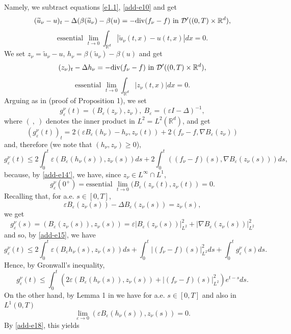 \documentclass[12pt]{article}
\def\cald{{\mathcal{D}}}
\def\dd{\displaystyle}
\theoremstyle{definition}
\def\rr{{\mathbb{R}}}
\def\9{{\infty}}
\def\wt{\widetilde}
\def\vp{{\varepsilon}}
\def\dd{\displaystyle}
\begin{document}
 Namely, we subtract equations \eqref{e1.1}, \eqref{add-e10} and get
 $$(\wt u_\nu- u)_t-\Delta(\beta(\wt u_\nu)-\beta(u)=-{\rm div}(f_\nu-f)\mbox{ in }\cald'((0,T)\times\rr^d),$$
 $$\mbox{essential }\lim_{t\to0}\int_{\rr^d}|\wt u_\nu(t,x)-u(t,x)|dx=0.$$
 We set $z_\nu=\wt u_\nu-u$, $h_\nu=\beta(\wt u_\nu)-\beta(u)$ and get
 \begin{equation}
 \label{add-e14a}
 (z_\nu)_t-\Delta h_\nu=-{\rm div}(f_\nu-f)\mbox{   in }\cald'((0,T)\times\rr^d),
 \end{equation}
\begin{equation}
\label{add-e14'}
\mbox{essential }\lim_{t\to0}\int_{\rr^d}|z_\nu(t,x)|dx=0.
\end{equation}
Arguing as in \cite{3} (proof of Proposition 1), we set
$$g^\nu_\vp(t)=(B_\vp(z_\nu),z_\nu),\ B_\vp=(\vp I-\Delta)^{-1},$$where $(\ ,\ )$ denotes the inner product in $L^2=L^2(\rr^d)$, and get
$$(g^\nu_\vp(t))_t=2(\vp B_\vp(h_\nu)-h_\nu,z_\nu(t))+2(f_\nu-f,\nabla B_\vp(z_\nu))$$and, therefore (we note that $(h_\nu,z_\nu)\ge0$),
 \begin{equation}
\label{add-e15}
g^\nu_\vp(t)\le2\dd\int^t_0\vp(B_\vp(h_\nu(s)),z_\nu(s))ds
+2\dd\int^t_0((f_\nu-f)(s),\nabla B_\vp(z_\nu(s)))ds,
\end{equation}because, by \eqref{add-e14'}, we have, since $z_\nu\in L^\9\cap L^1$,
 \begin{equation}
\label{add-e16}
g^\nu_\vp(0^+)=\mbox{essential }\lim_{t\to0}(B_\vp(z_\nu(t),z_\nu(t))=0.
\end{equation}
Recalling that, for a.e. $s\in[0,T]$,
$$\vp B_\vp(z_\nu(s))-\Delta B_\vp(z_\nu(s))=z_\nu(s),$$we get
$$g^\nu_\vp(s)=(B_\vp(z_\nu(s)),z_\nu(s))=\vp|B_\vp(z_\nu(s))|^2_{L^2}+|\nabla B_\vp(z_\nu(s))|^2_{L^2}$$
and so, by \eqref{add-e15}, we have
 \begin{equation}
\label{add-e17}
g^\nu_\vp(t)\le2\dd\int^t_0\vp(B_\vp h_\nu(s),z_\nu(s))ds
+\dd\int^t_0|(f_\nu-f)(s)|^2_{L^2}ds+\dd\int^t_0 g^\nu_\vp(s)ds.
\end{equation}Hence, by Gronwall's inequality,
 \begin{equation}
\label{add-e18}
g^\nu_\vp(t)\le\int^t_0(2\vp(B_\vp (h_\nu(s)),z_\nu(s))+|(f_\nu-f)(s)|^2_{L^2})e^{t-s}ds.
\end{equation}
On the other hand, by Lemma 1 in \cite{3} we have for a.e. $s\in[0,T]$ and also in $L^1(0,T)$
 \begin{equation}
\label{add-e18a}
\lim_{\vp\to0}(\vp B_\vp (h_\nu(s)),z_\nu(s))=0.
\end{equation}
By \eqref{add-e18}, this yields
\end{document}
